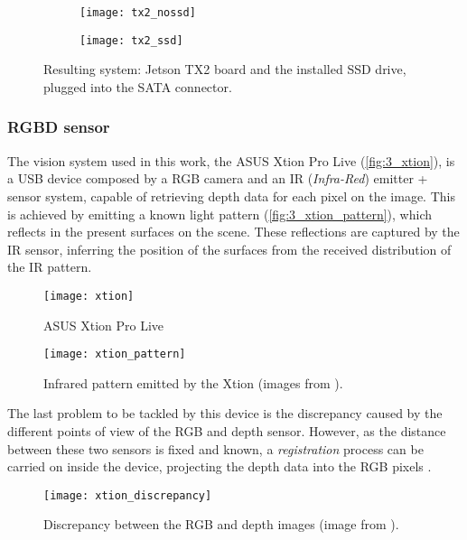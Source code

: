 \begin{figure}[h]
	\begin{subfigure}[h]{0.35\linewidth}
		\centering
		\texttt{[image: tx2\_nossd]}
	\end{subfigure}
	\begin{subfigure}[h]{0.35\linewidth}
		\centering
		\texttt{[image: tx2\_ssd]}
	\end{subfigure}
	\caption{Resulting system: Jetson TX2 board and the installed SSD drive, plugged into the SATA connector.}
	\label{fig:3_mytx2}
\end{figure}
\vspace{8cm}
\restoregeometry

\subsubsection{RGBD sensor}

The vision system used in this work, the ASUS Xtion Pro Live (\autoref{fig:3_xtion}), is a USB device composed by a RGB camera and an IR (\textit{Infra-Red}) emitter + sensor system, capable of retrieving depth data for each pixel on the image. This is achieved by emitting a known light pattern (\autoref{fig:3_xtion_pattern}), which reflects in the present surfaces on the scene. These reflections are captured by the IR sensor, inferring the position of the surfaces from the received distribution of the IR pattern.

\begin{figure}[h]
	\centering
	\texttt{[image: xtion]}
	\caption{ASUS Xtion Pro Live}
	\label{fig:3_xtion}
\end{figure}

\begin{figure}[h]
	\centering
	\texttt{[image: xtion\_pattern]}
	\caption{Infrared pattern emitted by the Xtion (images from \cite{rgbd_poses}).}
	\label{fig:3_xtion_pattern}
\end{figure}

The last problem to be tackled by this device is the discrepancy caused by the different points of view of the RGB and depth sensor. However, as the distance between these two sensors is fixed and known, a \textit{registration} process can be carried on inside the device, projecting the depth data into the RGB pixels \cite{diapos_cv_registration}.\\

\begin{figure}[h]
	\centering
	\texttt{[image: xtion\_discrepancy]}
	\caption{Discrepancy between the RGB and depth images (image from \cite{tfg}).}
	\label{fig:3_xtion_discrepancy}
\end{figure}

